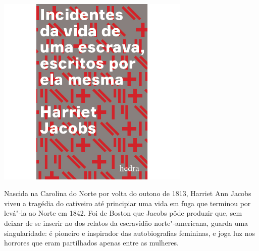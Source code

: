 \hspace*{-.4cm}\begin{minipage}[c]{.5\linewidth}
\small{
{}}
\end{minipage}

\pagebreak

\hspace{.5cm}

\begin{center}
\hspace*{.5cm}\includegraphics[width=92mm]{./grid/jacobs.jpg}
\end{center}

\hspace*{-7cm}\hrulefill\hspace*{-7cm}

\medskip

\noindent{}Nascida na Carolina do Norte por volta do outono de 1813, Harriet Ann Jacobs viveu a tragédia do cativeiro até principiar uma vida em fuga que terminou por levá"-la ao Norte em 1842. Foi de Boston que Jacobs pôde produzir {} que, sem deixar de se inserir no {} dos relatos da escravidão norte"-americana, guarda uma singularidade: é pioneiro e inspirador das autobiografias femininas, e joga luz nos horrores que eram partilhados apenas entre as mulheres.

